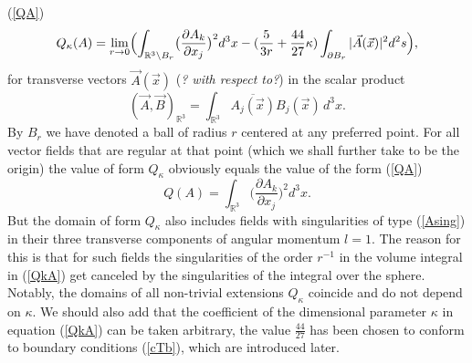\documentclass[12pt]{article}
\newcommand{\ol}{\overline}
\newcommand{\RR}{\mathbb{R}}
\begin{document}
(\ref{QA})
\begin{equation}
\label{QkA}
        Q_{\kappa}(A) = \lim_{r\to 0}\Bigl(
    \int_{\RR^{3}\setminus B_{r}}
        \bigl(\frac{\partial A_{k}}{\partial x_{j}}\bigr)^{2} d^{3} x -
    (\frac{5}{3r}+ \frac{44}{27}\kappa) \int_{\partial B_{r}}
        |\vec{A}(\vec{x})|^{2} d^{2} s \Bigr) ,
\end{equation}
	for transverse vectors
$ \vec{A}(\vec{x}) $
	({\it? with respect to?}) in the scalar product
\begin{equation*}
    (\vec{A},\vec{B})_{\RR^{3}} = \int_{\RR^{3}}
	\ol{A_{j}(\vec{x})} B_{j}(\vec{x}) \,d^{3}x .
\end{equation*}
	By
$ B_{r} $ we have denoted a ball of radius
$ r $
	centered at any preferred point.
	For all vector fields that are regular at that point (which we shall
	further take to be the origin) the value of form
$ Q_{\kappa} $
	obviously equals the value of the form
(\ref{QA})
\begin{equation*}
        Q(A) = \int_{\RR^{3}}
        \bigl(\frac{\partial A_{k}}{\partial x_{j}}\bigr)^{2} d^{3} x .
\end{equation*}
	But the domain of form
$ Q_{\kappa} $
	also includes fields with singularities of type
(\ref{Asing})
	in their three transverse components
	of angular momentum
$ l=1 $.
	The reason for this is that for such fields
	the singularities of the order
$ r^{-1} $
	in the volume integral in
(\ref{QkA})
	get canceled by the singularities of the integral over the sphere.
	Notably, the domains of all non-trivial extensions
$ Q_{\kappa} $
	coincide and do not depend on
$ \kappa $.
	We should also add that the coefficient of the dimensional parameter
$ \kappa $
	in equation
(\ref{QkA})
	can be taken arbitrary,
	the value
$ \frac{44}{27} $
	has been chosen to conform to boundary conditions
(\ref{cTb}),
	which are introduced later.
\end{document}
